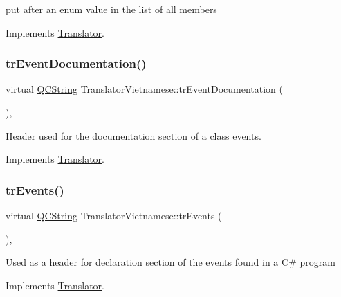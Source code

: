 put after an enum value in the list of all members 

Implements \mbox{\hyperlink{class_translator}{Translator}}.

\mbox{\label{class_translator_vietnamese_ad0aa62f0b15578fa9e494ff273166438}} 
\subsubsection{\texorpdfstring{trEventDocumentation()}{trEventDocumentation()}}
{\footnotesize\ttfamily virtual \mbox{\hyperlink{class_q_c_string}{Q\+C\+String}} Translator\+Vietnamese\+::tr\+Event\+Documentation (\begin{DoxyParamCaption}{ }\end{DoxyParamCaption})\hspace{0.3cm}{\ttfamily [inline]}, {\ttfamily [virtual]}}

Header used for the documentation section of a class\textquotesingle{} events. 

Implements \mbox{\hyperlink{class_translator}{Translator}}.

\mbox{\label{class_translator_vietnamese_a805e3ba6215964887711cd28c53325ea}} 
\subsubsection{\texorpdfstring{trEvents()}{trEvents()}}
{\footnotesize\ttfamily virtual \mbox{\hyperlink{class_q_c_string}{Q\+C\+String}} Translator\+Vietnamese\+::tr\+Events (\begin{DoxyParamCaption}{ }\end{DoxyParamCaption})\hspace{0.3cm}{\ttfamily [inline]}, {\ttfamily [virtual]}}

Used as a header for declaration section of the events found in a \mbox{\hyperlink{class_c}{C}}\# program 

Implements \mbox{\hyperlink{class_translator}{Translator}}.

\mbox{\label{class_translator_vietnamese_a756889cf2e219a203a64ef5cc45fc829}} 
